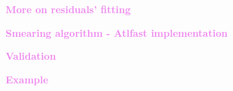 \documentclass[8pt]{beamer}
\begin{document}
\begin{frame}
  \begin{center}
    {\textcolor{violet}{\LARGE{\bf More on residuals' fitting}}}
  \end{center}
\end{frame}




\begin{frame}
  \begin{center}
    {\textcolor{violet}{\LARGE{\bf Smearing algorithm - Atlfast implementation}}}
  \end{center}
\end{frame}



\begin{frame}
  \begin{center}
    {\textcolor{violet}{\LARGE{\bf Validation}}}
  \end{center}
\end{frame}



\begin{frame}
  \begin{center}
    {\textcolor{violet}{\LARGE{\bf Example}}}
  \end{center}
\end{frame}


\end{document}
